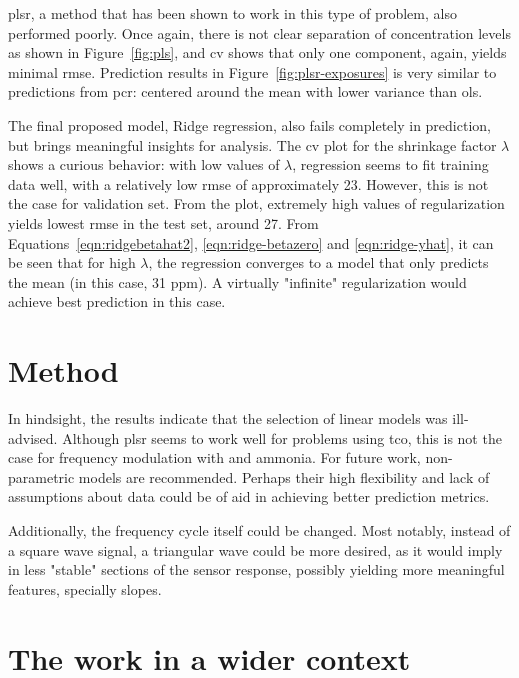 \acrshort{plsr}, a method that has been shown to work in this type of problem, also performed poorly. Once again, there is not clear separation of concentration levels as shown in Figure~\ref{fig:pls}, and \acrshort{cv} shows that only one component, again, yields minimal \acrshort{rmse}. Prediction results in Figure~\ref{fig:plsr-exposures} is very similar to predictions from \acrshort{pcr}: centered around the mean with lower variance than \acrshort{ols}.

The final proposed model, Ridge regression, also fails completely in prediction, but brings meaningful insights for analysis. The \acrshort{cv} plot for the shrinkage factor $\lambda$ shows a curious behavior: with low values of $\lambda$, regression seems to fit training data well, with a relatively low \acrshort{rmse} of approximately 23. However, this is not the case for validation set. From the plot, extremely high values of regularization yields lowest \acrshort{rmse} in the test set, around 27. From Equations~\ref{eqn:ridgebetahat2}, \ref{eqn:ridge-betazero} and \ref{eqn:ridge-yhat}, it can be seen that for high $\lambda$, the regression converges to a model that only predicts the mean (in this case, 31 ppm). A virtually "infinite" regularization would achieve best prediction in this case.

\section{Method}
\label{sec:discussion-method}

In hindsight, the results indicate that the selection of linear models was ill-advised. Although \acrshort{plsr} seems to work well for problems using \acrshort{tco}, this is not the case for frequency modulation with \nox and ammonia. For future work, non-parametric models are recommended. Perhaps their high flexibility and lack of assumptions about data could be of aid in achieving better prediction metrics.

Additionally, the frequency cycle itself could be changed. Most notably, instead of a square wave signal, a triangular wave could be more desired, as it would imply in less "stable" sections of the sensor response, possibly yielding more meaningful features, specially slopes.

\section{The work in a wider context}
\label{sec:work-wider-context}

